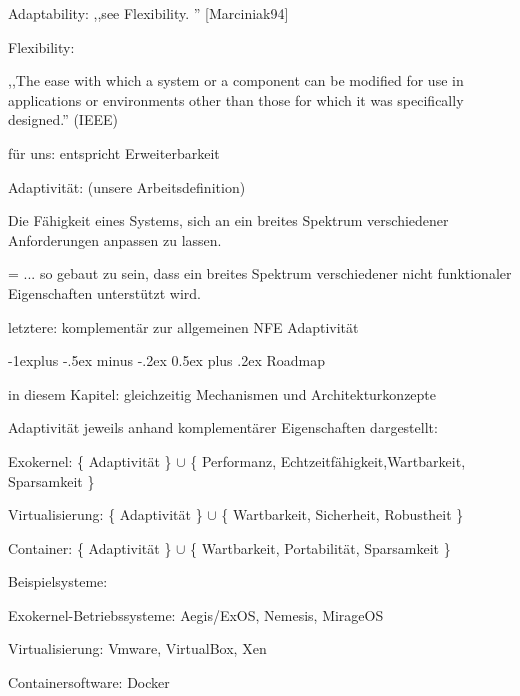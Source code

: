 \documentclass[a4paper]{article}
\makeatletter
\renewcommand{\subsection}{\@startsection{subsection}{2}{0mm}%
 {-1explus -.5ex minus -.2ex}%
 {0.5ex plus .2ex}%
 {\normalfont\normalsize\bfseries}}
\makeatother
\begin{document}
\begin{multicols}{3}
    \begin{itemize*}
        \item Adaptability: ,,see Flexibility. '' [Marciniak94]
        \item Flexibility:
        \begin{itemize*}
            \item ,,The ease with which a system or a component can be modified for use in applications or environments other than those for which it was specifically designed.'' (IEEE)
            \item für uns: entspricht Erweiterbarkeit
        \end{itemize*}
        \item Adaptivität: (unsere Arbeitsdefinition)
        \begin{itemize*}
            \item Die Fähigkeit eines Systems, sich an ein breites Spektrum verschiedener Anforderungen anpassen zu lassen.
            \item = ... so gebaut zu sein, dass ein breites Spektrum verschiedener nicht funktionaler Eigenschaften unterstützt wird.
            \item letztere: komplementär zur allgemeinen NFE Adaptivität
        \end{itemize*}
    \end{itemize*}


    \subsection{Roadmap}

    \begin{itemize*}
        \item in diesem Kapitel: gleichzeitig Mechanismen und Architekturkonzepte
        \item Adaptivität jeweils anhand komplementärer Eigenschaften dargestellt:
        \begin{itemize*}
            \item Exokernel: \{ Adaptivität \} $\cup$ \{ Performanz, Echtzeitfähigkeit,Wartbarkeit, Sparsamkeit \}
            \item Virtualisierung: \{ Adaptivität \} $\cup$ \{ Wartbarkeit, Sicherheit, Robustheit \}
            \item Container: \{ Adaptivität \} $\cup$ \{ Wartbarkeit, Portabilität, Sparsamkeit \}
        \end{itemize*}
        \item Beispielsysteme:
        \begin{itemize*}
            \item Exokernel-Betriebssysteme: Aegis/ExOS, Nemesis, MirageOS
            \item Virtualisierung: Vmware, VirtualBox, Xen
            \item Containersoftware: Docker
        \end{itemize*}
    \end{itemize*}



\end{multicols}
\end{document}
